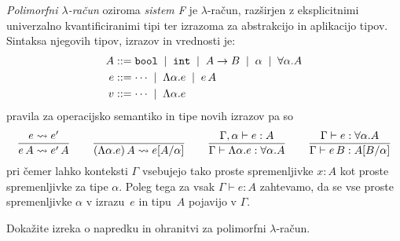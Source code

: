 \documentclass[arhiv]{izpit}
\begin{document}
\newcommand{\Funty}[2]{\forall #1. #2}
\newcommand{\Fun}[2]{\Lambda #1. #2}
\emph{Polimorfni $\lambda$-račun} oziroma \emph{sistem F} je $\lambda$-račun, razširjen z eksplicitnimi univerzalno kvantificiranimi tipi ter izrazoma za abstrakcijo in aplikacijo tipov. Sintaksa njegovih tipov, izrazov in vrednosti je:
\begin{align*}
  A &\bnfis
  \boolty \bnfor
  \intty \bnfor
  \funty{A}{B} \bnfor
  \alpha \bnfor
  \Funty{\alpha}{A} \\
  e &\bnfis
  \cdots \bnfor
  \Fun{\alpha}{e} \bnfor
  e \, A \\
  v &\bnfis
  \cdots \bnfor
  \Fun{\alpha}{e}
\end{align*}
pravila za operacijsko semantiko in tipe novih izrazov pa so
\[
\frac{
  e \leadsto e'
}{
  e \, A \leadsto e' \, A
}
\qquad
\frac{
  \hbox{}
}{
  (\Fun{\alpha}{e})\,A \leadsto e[A / \alpha]
}
\qquad
\frac{
  \Gamma, \alpha \vdash e : A
}{
  \Gamma \vdash \Fun{\alpha}{e} : \Funty{\alpha}{A}
}
\qquad
\frac{
  \Gamma \vdash e : \Funty{\alpha}{A}
}{
  \Gamma \vdash e \, B : A[B / \alpha]
}
\]
pri čemer lahko konteksti $\Gamma$ vsebujejo tako proste spremenljivke $x : A$ kot proste spremenljivke za tipe $\alpha$. Poleg tega za vsak $\Gamma \vdash e : A$ zahtevamo, da se vse proste spremenljivke $\alpha$ v izrazu~$e$ in tipu~$A$ pojavijo v $\Gamma$.

Dokažite izreka o napredku in ohranitvi za polimorfni $\lambda$-račun.

\nadaljevanje


\end{document}
